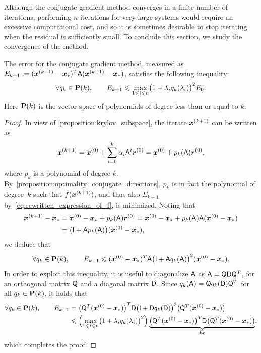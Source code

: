 Although the conjugate gradient method converges in a finite number of iterations,
performing $n$ iterations for very large systems  would require an excessive computational cost,
and so it is sometimes desirable to stop iterating when the residual is sufficiently small.
To conclude this section, we study the convergence of the method.
\begin{theorem}
    \label{theorem:convergence_conjugate_gradient}
    The error for the conjugate gradient method,
    measured as $E_{k+1} := (\mathbf{\boldsymbol{x}}^{(k+1)} - \mathbf{\boldsymbol{x}}_*)^T  \mathsf A (\mathbf{\boldsymbol{x}}^{(k+1)} - \mathbf{\boldsymbol{x}}_*)$,
    satisfies the following inequality:
    \begin{equation}
        \label{equation:convergence_conjugate_gradient}
        \forall q_k \in \mathbf P(k), \qquad
        E_{k+1} \leqslant  \max_{1\leqslant i \leqslant n}\bigl(1 + \lambda_i q_k(\lambda_i) \bigr)^2   E_0.
    \end{equation}
    Here $\mathbf P(k)$ is the vector space of polynomials of degree less than or equal to $k$.
\end{theorem}
\begin{proof}

In view of \cref{proposition:krylov_subspace},
the iterate $\mathbf{\boldsymbol{x}}^{(k+1)}$ can be written as
\[
    \mathbf{\boldsymbol{x}}^{(k+1)} = \mathbf{\boldsymbol{x}}^{(0)} + \sum_{i=0}^{k} \alpha_i \mathsf A^i \mathbf{\boldsymbol{r}}^{(0)}
    = \mathbf{\boldsymbol{x}}^{(0)} + p_k(\mathsf A) \mathbf{\boldsymbol{r}}^{(0)},
\]
where $p_k$ is a polynomial of degree $k$.
By~\cref{proposition:optimality_conjugate_directions},
$p_k$ is in fact the polynomial of degree~$k$ such that $f(\mathbf{\boldsymbol{x}}^{(k+1)})$,
and thus also $E_{k+1}$ by~\eqref{eq:rewritten_expression_of_f},
is minimized.
Noting that
\begin{align*}
    \mathbf{\boldsymbol{x}}^{(k+1)} - \mathbf{\boldsymbol{x}}_*
    &= \mathbf{\boldsymbol{x}}^{(0)}  - \mathbf{\boldsymbol{x}}_* + p_k(\mathsf A) \mathbf{\boldsymbol{r}}^{(0)}
    = \mathbf{\boldsymbol{x}}^{(0)}  - \mathbf{\boldsymbol{x}}_* + p_k(\mathsf A) \mathsf A (\mathbf{\boldsymbol{x}}^{(0)} - \mathbf{\boldsymbol{x}}_*) \\
    &= \bigl(\mathsf I + \mathsf A p_k(\mathsf A) \bigr) (\mathbf{\boldsymbol{x}}^{(0)} - \mathbf{\boldsymbol{x}}_*),
\end{align*}
we deduce that
\[
    \forall q_k \in \mathbf P(k), \qquad
    E_{k+1} \leqslant (\mathbf{\boldsymbol{x}}^{(0)} - \mathbf{\boldsymbol{x}}_*)^T \mathsf A \bigl(\mathsf I + \mathsf A q_k(\mathsf A) \bigr)^2  (\mathbf{\boldsymbol{x}}^{(0)} - \mathbf{\boldsymbol{x}}_*).
\]
In order to exploit this inequality,
it is useful to diagonalize $\mathsf A$ as $\mathsf A = \mathsf Q \mathsf D \mathsf Q^T$,
for an orthogonal matrix $\mathsf Q$ and a diagonal matrix $\mathsf D$.
Since $q_k(\mathsf A) = \mathsf Q q_k(\mathsf D) \mathsf Q^T$ for all $q_k \in \mathbf P(k)$,
it holds that
\begin{align*}
    \forall q_k \in \mathbf P(k), \qquad
    E_{k+1}
    &= \bigl(\mathsf Q^T (\mathbf{\boldsymbol{x}}^{(0)} - \mathbf{\boldsymbol{x}}_*)\bigr)^T \mathsf D \bigl(\mathsf I + \mathsf D q_k(\mathsf D) \bigr)^2  \bigl(\mathsf Q^T (\mathbf{\boldsymbol{x}}^{(0)} - \mathbf{\boldsymbol{x}}_*)\bigr) \\
    &\leqslant \Bigl( \max_{1\leqslant i \leqslant n}\bigl(1 + \lambda_i q_k(\lambda_i) \bigr)^2 \Bigr)  \underbrace{\bigl(\mathsf Q^T (\mathbf{\boldsymbol{x}}^{(0)} - \mathbf{\boldsymbol{x}}_*)\bigr)^T \mathsf D   \bigl(\mathsf Q^T (\mathbf{\boldsymbol{x}}^{(0)} - \mathbf{\boldsymbol{x}}_*)\bigr)}_{E_0},
\end{align*}
which completes the proof.
\end{proof}

